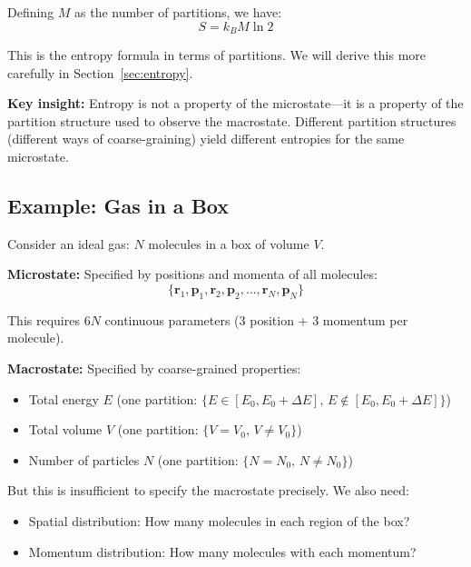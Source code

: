 \documentclass[twocolumn,10pt]{article}
\theoremstyle{definition}
\theoremstyle{remark}
\begin{document}
\noindent Defining $M$ as the number of partitions, we have:
\begin{equation}
\label{eq:entropy_partitions}
S = k_B M \ln 2
\end{equation}

\noindent This is the entropy formula in terms of partitions. We will derive this more carefully in Section~\ref{sec:entropy}.

\vspace{0.2cm}
\noindent\textbf{Key insight:} Entropy is not a property of the microstate—it is a property of the partition structure used to observe the macrostate. Different partition structures (different ways of coarse-graining) yield different entropies for the same microstate.

\subsection{Example: Gas in a Box}

Consider an ideal gas: $N$ molecules in a box of volume $V$.

\vspace{0.2cm}
\noindent\textbf{Microstate:} Specified by positions and momenta of all molecules:
\begin{equation}
\{\mathbf{r}_1, \mathbf{p}_1, \mathbf{r}_2, \mathbf{p}_2, \ldots, \mathbf{r}_N, \mathbf{p}_N\}
\end{equation}

This requires $6N$ continuous parameters (3 position + 3 momentum per molecule).

\vspace{0.2cm}
\noindent\textbf{Macrostate:} Specified by coarse-grained properties:
\begin{itemize}
\item Total energy $E$ (one partition: $\{E \in [E_0, E_0 + \Delta E], \, E \notin [E_0, E_0 + \Delta E]\}$)
\item Total volume $V$ (one partition: $\{V = V_0, \, V \neq V_0\}$)
\item Number of particles $N$ (one partition: $\{N = N_0, \, N \neq N_0\}$)
\end{itemize}

\noindent But this is insufficient to specify the macrostate precisely. We also need:
\begin{itemize}
\item Spatial distribution: How many molecules in each region of the box?
\item Momentum distribution: How many molecules with each momentum?
\end{itemize}
\end{document}
